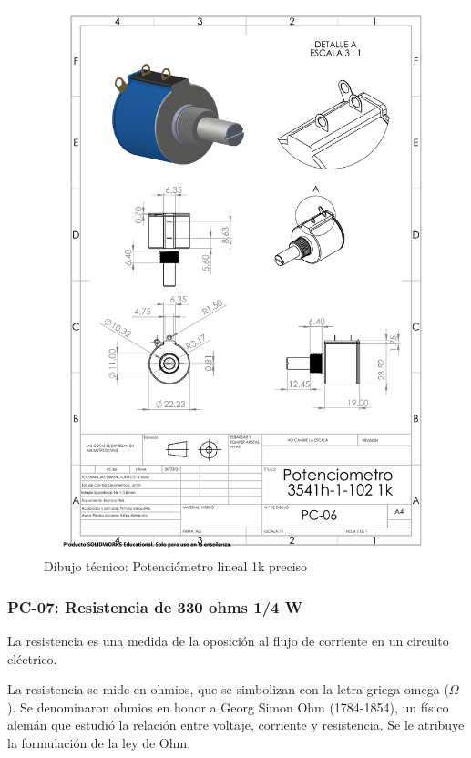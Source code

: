 \begin{figure}[H]
    \centering
    \includegraphics[trim = {7mm 1mm 1mm 1mm},clip,scale=0.4]{22/Img/potenciometroDibujo.PDF}
    \caption{Dibujo técnico: Potenciómetro lineal 1k preciso}
    \label{fig:potenciometro}
\end{figure}


\subsubsection{PC-07: Resistencia de 330 ohms 1/4 W }
La resistencia es una medida de la oposición al flujo de corriente en un circuito eléctrico.

La resistencia se mide en ohmios, que se simbolizan con la letra griega omega ($\Omega$). Se denominaron ohmios en honor a Georg Simon Ohm (1784-1854), un físico alemán que estudió la relación entre voltaje, corriente y resistencia. Se le atribuye la formulación de la ley de Ohm.

